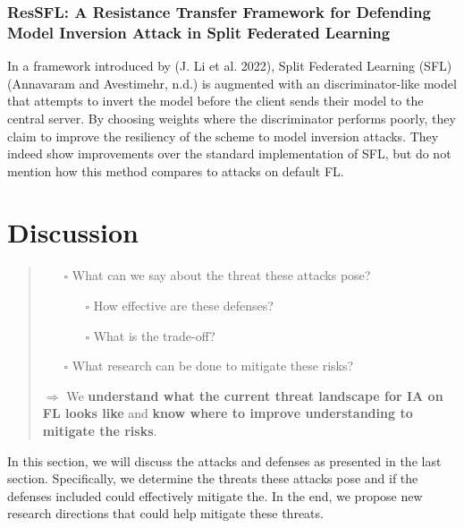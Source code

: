 \hypertarget{ressfl-a-resistance-transfer-framework-for-defending-model-inversion-attack-in-split-federated-learning}{%
\subsubsection{ResSFL: A Resistance Transfer Framework for Defending
Model Inversion Attack in Split Federated
Learning}\label{ressfl-a-resistance-transfer-framework-for-defending-model-inversion-attack-in-split-federated-learning}}

In a framework introduced by (J. Li et al. 2022), Split Federated
Learning (SFL) (Annavaram and Avestimehr, n.d.) is augmented with an
discriminator-like model that attempts to invert the model before the
client sends their model to the central server. By choosing weights
where the discriminator performs poorly, they claim to improve the
resiliency of the scheme to model inversion attacks. They indeed show
improvements over the standard implementation of SFL, but do not mention
how this method compares to attacks on default FL.

\hypertarget{discussion}{%
\section{Discussion}\label{discussion}}

\begin{quote}
\begin{itemize}
\tightlist
\item[$\square$]
  What can we say about the threat these attacks pose?

  \begin{itemize}
  \tightlist
  \item[$\square$]
    How effective are these defenses?
  \item[$\square$]
    What is the trade-off?
  \end{itemize}
\item[$\square$]
  What research can be done to mitigate these risks?
\end{itemize}

\(\Rightarrow\) We \textbf{understand what the current threat landscape
for IA on FL looks like} and \textbf{know where to improve understanding
to mitigate the risks}.
\end{quote}

In this section, we will discuss the attacks and defenses as presented
in the last section. Specifically, we determine the threats these
attacks pose and if the defenses included could effectively mitigate
the. In the end, we propose new research directions that could help
mitigate these threats.

